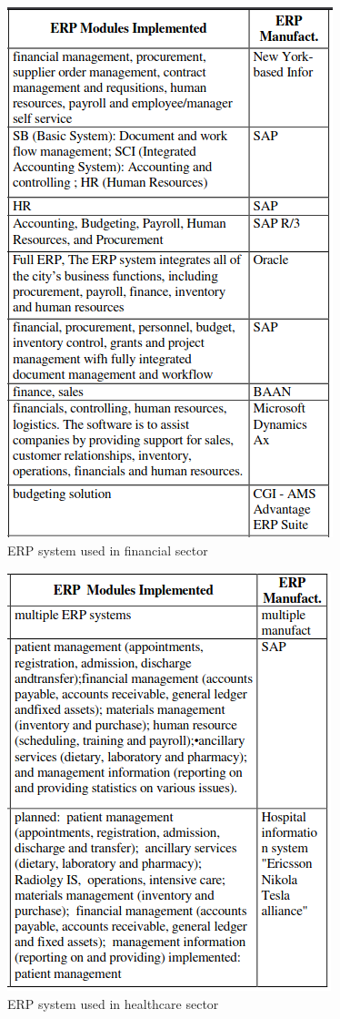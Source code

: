 \begin{figure}[htb]
\centering
	\includegraphics[scale=0.5]{Chapter1/Figures/ERP2.png}	
	\caption{ERP system used in financial sector }
	\label{fig:ERPFinance}
\end{figure}

\begin{figure}[htb]
    \centering
        \includegraphics[scale=0.5]{Chapter1/Figures/ERP4.png}	
        \caption{ERP system used in healthcare sector }
        \label{fig:ERPHealthcare}
    \end{figure}
    





